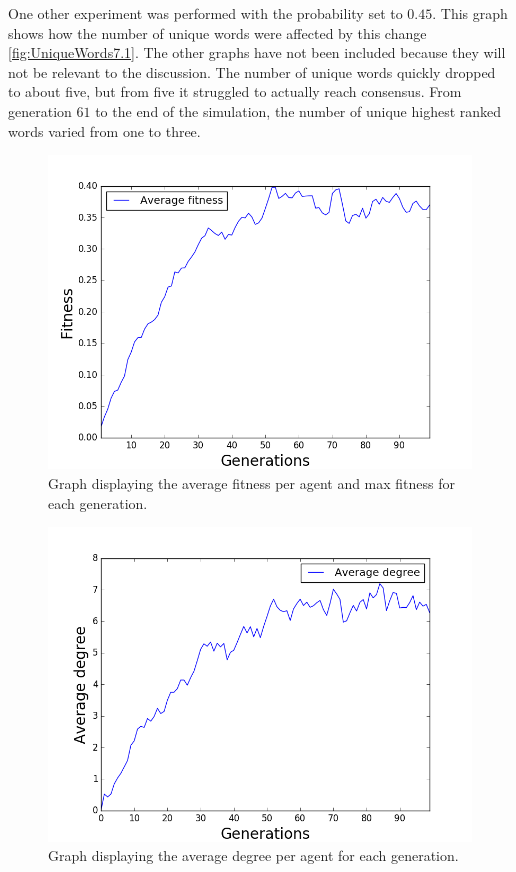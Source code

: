 One other experiment was performed with the probability set to $0.45$. This graph shows how the number of unique words were affected by this change \ref{fig:UniqueWords7.1}. The other graphs have not been included because they will not be relevant to the discussion. The number of unique words quickly dropped to about five, but from five it struggled to actually reach consensus. From generation $61$ to the end of the simulation, the number of unique highest ranked words varied from one to three.  
\begin{figure}[htbp]
    \centering
    \includegraphics[scale=0.5]{fig/Results/Exp7/Fitness1}
    \caption{Graph displaying the average fitness per agent and max fitness for each generation.}
    \label{fig:Fitness7}
\end{figure}
\begin{figure}[htbp]
    \centering
    \includegraphics[scale=0.5]{fig/Results/Exp7/Degree1}
    \caption{Graph displaying the average degree per agent for each generation.}
    \label{fig:Degree7}
\end{figure}
